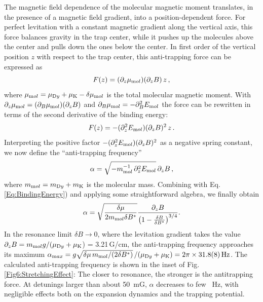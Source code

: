 The magnetic field dependence of the molecular magnetic moment translates, in the presence of a magnetic field gradient, into a position-dependent force. For perfect levitation with a constant magnetic gradient along the vertical axis, this force balances gravity in the trap center, while it pushes up the molecules above the center and pulls down the ones below the center.
In first order of the vertical position $z$ with respect to the trap center, this anti-trapping force can be expressed as
\begin{equation}
	F(z) = (\partial_z \mu_{\textrm mol})
	(\partial_z B) \, z \, ,
\end{equation}
where $\mu_{\textrm mol} = \mu_{\textrm Dy} + \mu_{\textrm K} - \delta \mu_{\textrm mol}$ is the total molecular magnetic moment.
With $\partial_z \mu_{\textrm mol} =  (\partial_B \mu_{\textrm mol}) (\partial_z B)$ and
$\partial_B \mu_{\textrm mol} = -\partial^2_B E_{\textrm mol}$ the force can be rewritten in terms of the second derivative of the binding energy:
\begin{equation}
F(z) = -(\partial^2_z E_{\textrm mol})
(\partial_z B)^2 \, z \, .
\end{equation}
Interpreting the positive factor $-(\partial^2_z E_{\textrm mol})
(\partial_z B)^2 $ as a negative spring constant,
we now define the ``anti-trapping frequency''
\begin{equation}
\alpha = \sqrt{-m_{\textrm mol}^{-1} \, \partial^2_z E_{\textrm mol}} \, \partial_z B \, ,
\end{equation}
where $m_{\textrm mol} = m_{\textrm Dy} + m_{\textrm K}$ is the molecular mass.
Combining with Eq.\,\ref{Eq:BindingEnergy}) and applying some straightforward algebra, we finally obtain
\begin{equation}\label{Eq:AntitrapFreq}
\alpha=\sqrt{\frac{\delta\mu}{2m_{\textrm mol}\delta B^*}}\frac{\partial_zB}{\left(1-\frac{\delta B}{\delta B^*}\right)^{3/4}}.
\end{equation}
In the resonance limit $\delta B \rightarrow 0$, where the levitation gradient takes the value $\partial_z B = m_{\textrm mol} g / (\mu_{\textrm Dy} + \mu_{\textrm K}$) = 3.21\,G/cm, the anti-trapping frequency approaches its maximum $\alpha_{\textrm max} = g \sqrt{\delta \mu\,m_{\textrm mol} / (2 \delta B^*)} \, /(\mu_{\textrm Dy}+\mu_{\textrm K}) = 2\pi \times \SI{31.8(8)}{\hertz}$. The calculated anti-trapping frequency is shown in the inset of Fig.\,\ref{Fig6:StretchingEffect}: The closer to resonance, the stronger is the antitrapping force. At detunings larger than about \SI{50}{\milli G}, $\alpha$ decreases to few \SI{}{\hertz}, with negligible effects both on the expansion dynamics and the trapping potential.

